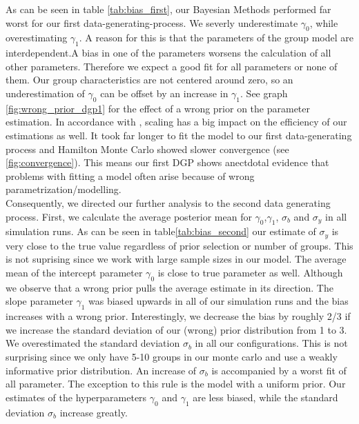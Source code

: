 As can be seen in table  \ref{tab:bias_first}, our Bayesian Methods performed far worst for our first data-generating-process. We severly underestimate $\gamma_0$, while overestimating $\gamma_1$.
A reason for this is that the parameters of the group model are interdependent.A bias in one of the parameters worsens the calculation of all other parameters.  Therefore we expect a good fit for all parameters or none of them. Our group characteristics are not centered around zero, so an underestimation of $\gamma_0$  can be offset by an increase in $\gamma_1$. See graph \ref{fig:wrong_prior_dgp1} for the effect of a wrong prior on the parameter estimation.
In accordance with \cite{gelman2008weakly}, scaling has a big impact on the efficiency of our estimations as well. 
It took far longer to fit the model to our first data-generating process  and Hamilton Monte Carlo showed slower convergence (see \ref{fig:convergence}). This means our first DGP shows anectdotal evidence that problems with fitting a model often arise because of wrong parametrization/modelling.
\\
Consequently, we directed our further analysis to the second data generating process.
First, we calculate the average posterior mean for $\gamma_0$,$\gamma_1$, $\sigma_b $ and $\sigma_y$ in all simulation runs.
As can be seen in table\ref{tab:bias_second} our estimate of $\sigma_y$ is very close to the true value regardless of prior selection or number of groups. This is not suprising since we work with large sample sizes in our model. 
The average mean of the intercept parameter $\gamma_0$ is close to true parameter as well. Although we observe that a wrong prior pulls the average estimate in its direction.
The slope parameter $\gamma_1$ was biased upwards in all of our simulation runs and the bias increases with a wrong prior. Interestingly, we decrease the bias by roughly 2/3 if we increase the standard deviation of our (wrong) prior distribution from 1 to 3. \\
We overestimated the standard deviation $\sigma_b$ in all our configurations. This is not surprising since we only have 5-10 groups in our monte carlo and use a weakly informative prior distribution. An increase of $\sigma_b$ is accompanied by a worst fit of all parameter. The exception to this rule is the model with a uniform prior. Our estimates of the hyperparameters $\gamma_0$ and $\gamma_1$ are less biased, while the standard deviation $\sigma_b$ increase greatly.\\
 
